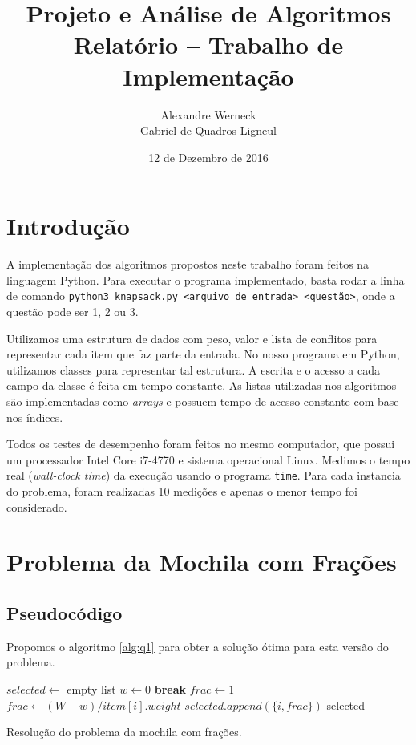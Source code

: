 \documentclass[a4paper, 11pt]{article}
\title{Projeto e Análise de Algoritmos\\Relatório -- Trabalho de Implementação}
\author{Alexandre Werneck\\Gabriel de Quadros Ligneul}
\date{12 de Dezembro de 2016}
\begin{document}
\maketitle

\section{Introdução}

A implementação dos algoritmos propostos neste trabalho foram feitos na linguagem Python.
Para executar o programa implementado, basta rodar a linha de comando \texttt{python3 knapsack.py <arquivo de entrada> <questão>}, onde a questão pode ser 1, 2 ou 3.

Utilizamos uma estrutura de dados com peso, valor e lista de conflitos para representar cada item que faz parte da entrada.
No nosso programa em Python, utilizamos classes para representar tal estrutura.
A escrita e o acesso a cada campo da classe é feita em tempo constante.
As listas utilizadas nos algoritmos são implementadas como \emph{arrays} e possuem tempo de acesso constante com base nos índices.

Todos os testes de desempenho foram feitos no mesmo computador, que possui um processador Intel Core i7-4770 e sistema operacional Linux.
Medimos o tempo real (\emph{wall-clock time}) da execução usando o programa \texttt{time}.
Para cada instancia do problema, foram realizadas 10 medições e apenas o menor tempo foi considerado.

\section{Problema da Mochila com Frações}

\subsection{Pseudocódigo}

Propomos o algoritmo \ref{alg:q1} para obter a solução ótima para esta versão do problema.

\begin{algorithm}[htb]
\begin{algorithmic}[1]
    \EndFor
    \State $selected \gets $ empty list
    \State $w \gets 0$
        \State \textbf{break}
        \State $frac \gets 1$
      \Else
        \State $frac \gets (W - w) / item[i].weight$
      \EndIf
      \State $selected.append(\{i, frac\})$
    \EndFor
    \State \Return selected
  \EndFunction
\end{algorithmic}
\caption{Resolução do problema da mochila com frações.}
\label{alg:q1}
\end{algorithm}
\end{document}
